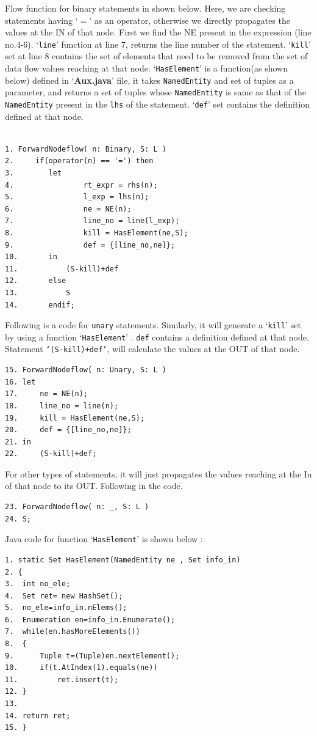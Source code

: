 \documentclass[11pt,a4paper,openright]{report}
\begin{document}
Flow function for binary statements in shown below. Here, we are checking statements having `$=$' as an operator, otherwise we  
directly propagates the values at the IN of that node. First we find the NE present in the expression (line no.4-6). `\texttt{line}'
 function at line 7, returns the line number of the statement. `\texttt{kill}' set at line 8 contains the set of elements that need 
 to be removed from the set of data flow values reaching at that node. `\texttt{HasElement}' is a function(as shown below) defined in
`\textbf{Aux.java}' file, it takes \texttt{NamedEntity} and set of tuples as a parameter, and returns a set of tuples whose \texttt{NamedEntity} is same
as that of the \texttt{NamedEntity} present in the \texttt{lhs} of the statement. `\texttt{def}' set contains the definition defined at that node.


\begin{lstlisting}[]  % Start your code-block

1. ForwardNodeflow( n: Binary, S: L )
2.     if(operator(n) == '=') then   
3.        let        
4.                rt_expr = rhs(n);
5.                l_exp = lhs(n);
6.                ne = NE(n);
7.                line_no = line(l_exp);
8.                kill = HasElement(ne,S); 
9.                def = {[line_no,ne]};
10.       in
11.       	  (S-kill)+def        
12.       else
13.        	  S
14.       endif;
\end{lstlisting}

Following is a code for \texttt{unary} statements. Similarly, it will generate a `\texttt{kill}' set by using a function `\texttt{HasElement}' 
. \texttt{def} contains a definition defined at that node. Statement \texttt{`(S-kill)+def'}, will calculate the values at the OUT of that
node.
\begin{lstlisting}[]
15. ForwardNodeflow( n: Unary, S: L )
16.	let
17.		ne = NE(n);
18.		line_no = line(n);
19.		kill = HasElement(ne,S);
20.		def = {[line_no,ne]};
21.	in
22.		(S-kill)+def;
\end{lstlisting}

For other types of statements, it will just propagates the values reaching at the In of that node to its OUT. Following in the code.

\begin{lstlisting}[]
23. ForwardNodeflow( n: _, S: L ) 
24.	S;
\end{lstlisting}

Java code for function `\texttt{HasElement}' is shown below :
\begin{lstlisting}
1. static Set HasElement(NamedEntity ne , Set info_in)
2. {
3.	int no_ele;
4.	Set ret= new HashSet();
5.	no_ele=info_in.nElems();
6.	Enumeration en=info_in.Enumerate();
7.	while(en.hasMoreElements())
8.	{
9.		Tuple t=(Tuple)en.nextElement();
10.		if(t.AtIndex(1).equals(ne))
11.			ret.insert(t);
12.	}	
13.
14.	return ret;
15. }

\end{lstlisting}
\end{document}
